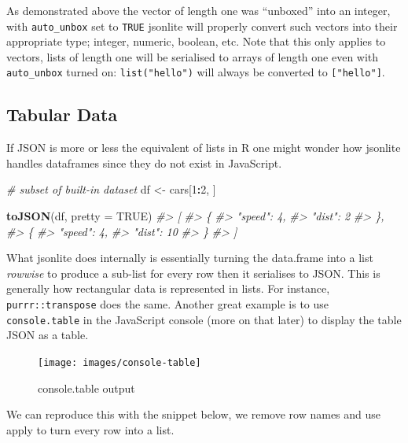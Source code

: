 \documentclass[10pt,]{krantz}
\makeatletter
\newenvironment{Shaded}{\begin{snugshade}}{\end{snugshade}}
\newcommand{\CommentTok}[1]{\textcolor[rgb]{0.37,0.37,0.37}{\textit{#1}}}
\newcommand{\DataTypeTok}[1]{\textcolor[rgb]{0.27,0.27,0.27}{#1}}
\newcommand{\DecValTok}[1]{\textcolor[rgb]{0.06,0.06,0.06}{#1}}
\newcommand{\KeywordTok}[1]{\textcolor[rgb]{0.27,0.27,0.27}{\textbf{#1}}}
\newcommand{\NormalTok}[1]{#1}
\newcommand{\OperatorTok}[1]{\textcolor[rgb]{0.43,0.43,0.43}{\textbf{#1}}}
\newcommand{\OtherTok}[1]{\textcolor[rgb]{0.37,0.37,0.37}{#1}}
\newcommand{\StringTok}[1]{\textcolor[rgb]{0.5,0.5,0.5}{#1}}
\newenvironment{kframe}{%
\medskip{}
\setlength{\fboxsep}{.8em}
 \def\at@end@of@kframe{}%
 \ifinner\ifhmode%
  \def\at@end@of@kframe{\end{minipage}}%
  \begin{minipage}{\columnwidth}%
 \fi\fi%
 \def\FrameCommand##1{\hskip\@totalleftmargin \hskip-\fboxsep
 \colorbox{shadecolor}{##1}\hskip-\fboxsep
     \hskip-\linewidth \hskip-\@totalleftmargin \hskip\columnwidth}%
 \MakeFramed {\advance\hsize-\width
   \@totalleftmargin\z@ \linewidth\hsize
   \@setminipage}}%
 {\par\unskip\endMakeFramed%
 \at@end@of@kframe}
\renewenvironment{Shaded}{\begin{kframe}}{\end{kframe}}
\makeatother
\begin{document}
As demonstrated above the vector of length one was ``unboxed'' into an integer, with \texttt{auto\_unbox} set to \texttt{TRUE} jsonlite will properly convert such vectors into their appropriate type; integer, numeric, boolean, etc. Note that this only applies to vectors, lists of length one will be serialised to arrays of length one even with \texttt{auto\_unbox} turned on: \texttt{list("hello")} will always be converted to \texttt{{[}"hello"{]}}.

\hypertarget{basics-tabular}{%
\subsection{Tabular Data}\label{basics-tabular}}

If JSON is more or less the equivalent of lists in R one might wonder how jsonlite handles dataframes since they do not exist in JavaScript.

\begin{Shaded}
\begin{Highlighting}[]
\CommentTok{# subset of built-in dataset}
\NormalTok{df <-}\StringTok{ }\NormalTok{cars[}\DecValTok{1}\OperatorTok{:}\DecValTok{2}\NormalTok{, ]}

\KeywordTok{toJSON}\NormalTok{(df, }\DataTypeTok{pretty =} \OtherTok{TRUE}\NormalTok{)}
\CommentTok{#> [}
\CommentTok{#>   \{}
\CommentTok{#>     "speed": 4,}
\CommentTok{#>     "dist": 2}
\CommentTok{#>   \},}
\CommentTok{#>   \{}
\CommentTok{#>     "speed": 4,}
\CommentTok{#>     "dist": 10}
\CommentTok{#>   \}}
\CommentTok{#> ]}
\end{Highlighting}
\end{Shaded}

What jsonlite does internally is essentially turning the data.frame into a list \emph{rowwise} to produce a sub-list for every row then it serialises to JSON. This is generally how rectangular data is represented in lists. For instance, \texttt{purrr::transpose} does the same. Another great example is to use \texttt{console.table} in the JavaScript console (more on that later) to display the table JSON as a table.

\begin{figure}[H]

{\centering \texttt{[image: images/console-table]} 

}

\caption{console.table output}\label{fig:console-table}
\end{figure}

We can reproduce this with the snippet below, we remove row names and use apply to turn every row into a list.
\end{document}
